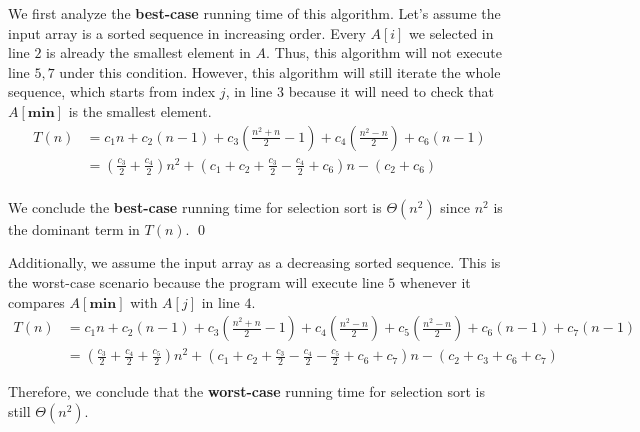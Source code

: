 \documentclass[a4paper]{article}
\makeatletter
\newenvironment{solution}
  {\begin{proof}[Solution]}
  {\end{proof}}
\renewenvironment{proof}[1][\proofname]{%
  \par\pushQED{\qed}\normalfont%
  \topsep6\p@\@plus6\p@\relax
  \trivlist\item[\hskip\labelsep\bfseries#1\@addpunct{.}]%
  \ignorespaces
}{%
  \popQED\endtrivlist\@endpefalse
}
\makeatother
\begin{document}
\begin{solution}
  We first analyze the \textbf{best-case} running time of this algorithm. Let's assume the input array is a sorted sequence in increasing order. Every $A[i]$ we selected in line $2$ is already the smallest element in $A$. Thus, this algorithm will not execute line $5, 7$ under this condition. However, this algorithm will still iterate the whole sequence, which starts from index $j$, in line $3$ because it will need to check that $A[\textbf{min}]$ is the smallest element.
  \begin{align*}
    T(n)  &= c_1 n + c_2(n - 1) + c_3(\frac{n^2 + n}{2} - 1) + c_4(\frac{n^2 - n}{2}) + c_6(n -1)\\
         &= (\frac{c_3}{2} + \frac{c_4}{2}) n^2 + (c_1 + c_2 + \frac{c_3}{2} - \frac{c_4}{2} + c_6)n - (c_2 + c_6) \\
  \end{align*}

  We conclude the \textbf{best-case} running time for selection sort is $\Theta(n^2)$ since $n^2$ is the dominant term in $T(n)$. \qed

  Additionally, we assume the input array as a decreasing sorted sequence. This is the worst-case scenario because the program will execute line $5$ whenever it compares $A[\textbf{min}]$ with $A[j]$ in line $4$.
  \begin{align*}
    T(n) &=c_1 n + c_2(n - 1) + c_3(\frac{n^2 + n}{2} - 1) + c_4(\frac{n^2 - n}{2})+c_5(\frac{n^2 - n}{2}) + c_6(n - 1) + c_7(n - 1)\\
         &= (\frac{c_3}{2} + \frac{c_4}{2} + \frac{c_5}{2})n^2 + (c_1 + c_2 + \frac{c_3}{2} - \frac{c_4}{2} - \frac{c_5}{2} + c_6 + c_7)n - (c_2 + c_3 + c_6 + c_7)
  \end{align*}

  Therefore, we conclude that the \textbf{worst-case} running time for selection sort is still $\Theta(n^2)$.
\end{solution}
\end{document}
